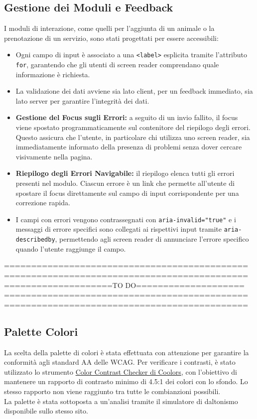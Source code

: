 \subsection{Gestione dei Moduli e Feedback}
I moduli di interazione, come quelli per l'aggiunta di un animale o la prenotazione di un servizio, sono stati progettati per essere accessibili:
\begin{itemize}
    \item Ogni campo di input è associato a una \texttt{<label>} esplicita tramite l'attributo \texttt{for}, garantendo che gli utenti di screen reader comprendano quale informazione è richiesta.
    \item La validazione dei dati avviene sia lato client, per un feedback immediato, sia lato server per garantire l'integrità dei dati.
    \item \textbf{Gestione del Focus sugli Errori:} a seguito di un invio fallito, il focus viene spostato programmaticamente sul contenitore del riepilogo degli errori. Questo assicura che l'utente, in particolare chi utilizza uno screen reader, sia immediatamente informato della presenza di problemi senza dover cercare visivamente nella pagina.
    \item \textbf{Riepilogo degli Errori Navigabile:} il riepilogo elenca tutti gli errori presenti nel modulo. Ciascun errore è un link che permette all'utente di spostare il focus direttamente sul campo di input corrispondente per una correzione rapida.
    \item I campi con errori vengono contrassegnati con \texttt{aria-invalid="true"} e i messaggi di errore specifici sono collegati ai rispettivi input tramite \texttt{aria-describedby}, permettendo agli screen reader di annunciare l'errore specifico quando l'utente raggiunge il campo.
\end{itemize}
=============================================\\
=============================================\\
====================TO DO====================\\
=============================================\\
=============================================\\
\subsection{Palette Colori}
La scelta della palette di colori è stata effettuata con attenzione per garantire la conformità agli standard AA delle WCAG. Per verificare i contrasti, è stato utilizzato lo strumento \href{https://coolors.co/contrast-checker}{Color Contrast Checker di Coolors}, con l’obiettivo di mantenere un rapporto di contrasto minimo di 4.5:1 dei colori con lo sfondo.
Lo stesso rapporto non viene raggiunto tra tutte le combianzioni possibili.\\
La palette è stata sottoposta a un’analisi tramite il simulatore di daltonismo disponibile sullo stesso sito.

